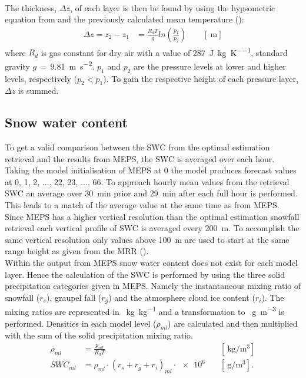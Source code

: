 \\
The thickness, $\Delta z$, of each layer is then be found by using the hypsometric equation from \citet{martin_mid-latitude_2006} and the previously calculated mean temperature ():
\begin{equation}
\begin{split}
\Delta z  = z_2 - z_1 
& = \frac{R_d \overline{T}}{g} ln\left(\frac{p_1}{p_2} \right) \qquad [\SI{}{\metre}]
\end{split}
\label{eq:hypsometric}
\end{equation}
where $R_d$ is gas constant for dry air with a value of \SI{287}{\joule\per\kilogram\per\kelvin},  standard gravity $g\,=\,$\SI{9.81}{\metre\per\square\second}. $p_1$ and $p_2$ are the pressure levels at lower and higher levels, respectively ($p_2 < p_1$).
To gain the respective height of each pressure layer, $\Delta z$ is summed.

\subsection{Snow water content}
To get a valid comparison between the SWC from the optimal estimation retrieval and the results from MEPS, the SWC is averaged over each hour. Taking the model initialisation of MEPS at \SI{0}{\UTC} the model produces forecast values at \SI{0}{}, \SI{1}{}, \SI{2}{}, $\ldots$, \SI{22}{}, \SI{23}{}, $\ldots$, \SI{66}{\UTC}. To approach hourly mean values from the retrieval SWC an average over \SI{30}{\minute} prior and \SI{29}{\minute} after each full hour is performed. This leads to a match of the average value at the same time as from MEPS. \\
Since MEPS has a higher vertical resolution than the optimal estimation snowfall retrieval each vertical profile of SWC is averaged every \SI{200}{\metre}. To accomplish the same vertical resolution only values above \SI{100}{\metre} are used to start at the same range height as given from the MRR ().
\\
Within the output from MEPS snow water content does not exist for each model layer. Hence the calculation of the SWC is performed by using the three solid precipitation categories given in MEPS. Namely the instantaneous mixing ratio of snowfall ($r_s$), graupel fall ($r_g$) and the atmosphere cloud ice content ($r_i$). The mixing ratios are represented in \SI{}{\kg\per\kg} and a transformation to \SI{}{\g\per\cubic\meter} is performed. Densities in each model level ($\rho_{ml}$) are calculated and then multiplied with the sum of the solid precipitation mixing ratio. 
\begin{align}
	\rho_{ml} & = \frac{p_{ml}}{R_d T} & \quad [\SI{}{\kg\per\cubic\meter}]  \\
	SWC_{ml} & = \rho_{ml} \cdot (r_s + r_g + r_i)_{ml} \cdot \num{e6} & \quad [\SI{}{\g\per\cubic\meter}].
	\label{eq:SWC_ml}
\end{align}

